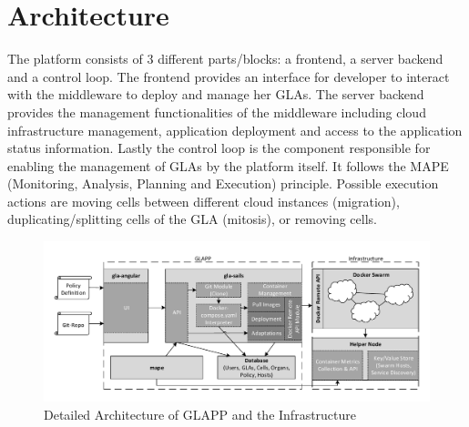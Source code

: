 \documentclass{seal_thesis}
\begin{document}
\section{Architecture}
The platform consists of 3 different parts/blocks: a frontend, a server backend and a control loop.
The frontend provides an interface for developer to interact with the middleware to deploy and manage her GLAs.
The server backend provides the management functionalities of the middleware including cloud infrastructure management, application deployment and access to the application status information.
Lastly the control loop is the component responsible for enabling the management of GLAs by the platform itself.
It follows the MAPE (Monitoring, Analysis, Planning and Execution) principle.
Possible execution actions are moving cells between different cloud instances (migration), duplicating/splitting cells of the GLA (mitosis), or removing cells.

\begin{figure}[!ht]
\centering
	\includegraphics[width=\textwidth]{detailed_architecture.pdf}
	\caption{Detailed Architecture of GLAPP and the Infrastructure}
	\label{fig:detailed}
\end{figure}
\end{document}
